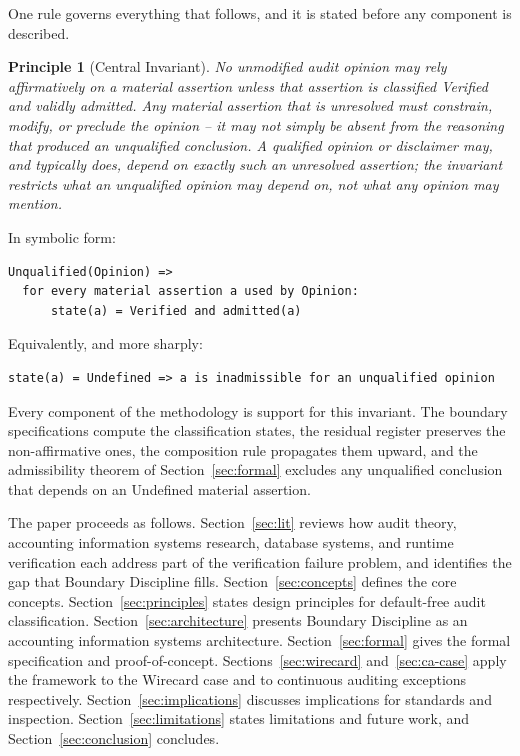 \documentclass[11pt,a4paper]{article}
\newtheorem{principle}{Principle}[section]
\theoremstyle{definition}
\theoremstyle{remark}
\begin{document}
One rule governs everything that follows, and it is stated before any component is described.

\begin{principle}[Central Invariant]
\label{prin:invariant}
No unmodified audit opinion may rely affirmatively on a material assertion unless that assertion is classified Verified and validly admitted. Any material assertion that is unresolved must constrain, modify, or preclude the opinion -- it may not simply be absent from the reasoning that produced an unqualified conclusion. A qualified opinion or disclaimer may, and typically does, depend on exactly such an unresolved assertion; the invariant restricts what an \emph{unqualified} opinion may depend on, not what any opinion may mention.
\end{principle}

In symbolic form:

\begin{lstlisting}[numbers=none]
Unqualified(Opinion) =>
  for every material assertion a used by Opinion:
      state(a) = Verified and admitted(a)
\end{lstlisting}

Equivalently, and more sharply:

\begin{lstlisting}[numbers=none]
state(a) = Undefined => a is inadmissible for an unqualified opinion
\end{lstlisting}

Every component of the methodology is support for this invariant. The boundary specifications compute the classification states, the residual register preserves the non-affirmative ones, the composition rule propagates them upward, and the admissibility theorem of Section~\ref{sec:formal} excludes any unqualified conclusion that depends on an \textsf{Undefined} material assertion.

The paper proceeds as follows. Section~\ref{sec:lit} reviews how audit theory, accounting information systems research, database systems, and runtime verification each address part of the verification failure problem, and identifies the gap that Boundary Discipline fills. Section~\ref{sec:concepts} defines the core concepts. Section~\ref{sec:principles} states design principles for default-free audit classification. Section~\ref{sec:architecture} presents Boundary Discipline as an accounting information systems architecture. Section~\ref{sec:formal} gives the formal specification and proof-of-concept. Sections~\ref{sec:wirecard} and~\ref{sec:ca-case} apply the framework to the Wirecard case and to continuous auditing exceptions respectively. Section~\ref{sec:implications} discusses implications for standards and inspection. Section~\ref{sec:limitations} states limitations and future work, and Section~\ref{sec:conclusion} concludes.
\end{document}
